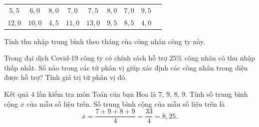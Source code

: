 \begin{bt}%
	\begin{center}
		\begin{tabular}{c c c c c c c c c }
			$5{,}5$ & $6{,}0$ & $8{,}0$ & $7{,}0$ & $7{,}5$ & $8{,}0$ & $7{,}0$ & $9{,}5$ \\
			$12{,}0$ & $10{,}0$ & $4{,}5$ & $11{,}0$ & $13{,}0$ & $9{,}5$ & $8{,}5$ & $4{,}0$\\
		\end{tabular}
	\end{center}
	\begin{listEX}[1]
		\item [a.] Tính thu nhập trung bình theo tháng của công nhân công ty này.
		\item [b.] Trong đại dịch Covid-19 công ty có chính sách hỗ trợ $25\%$ công nhân có thu nhập thấp nhất. Số nào trong các tứ phân vị giúp xác định các công nhân trong diện được hỗ trợ? Tính giá trị tứ phân vị đó.
	\end{listEX}
		\end{bt}

\begin{bt}%
	Kết quả $4$ lần kiểm tra môn Toán của bạn Hoa là $7$, $9$, $8$, $9$. Tính số trung bình cộng $\overline{x}$ của mẫu số liệu trên.
	\loigiai
	{Số trung bình cộng của mẫu số liệu trên là 
		\[\overline{x}=\dfrac{7+9+8+9}{4}=\dfrac{33}{4}=8{,}25.\]
	}
\end{bt}

